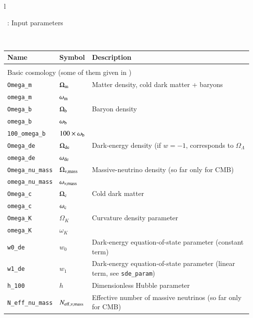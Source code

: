\documentclass[11pt, chapterprefix, headsepline]{scrartcl}
\begin{document}
\begin{longtable}{l}
% 

  \label{tab:spar}

 \centerline{\tablename\ \thetable{}: Input parameters}\\

 \endfirsthead

\begin{minipage}{\textwidth}
  \begin{tabularx}{\textwidth}{llX} \hline\hline
    \rul Name & Symbol & Description \\
    \hline \\
    \hline \multicolumn{3}{l}{\rul Basic cosmology \quad (some of them given in \file{cosmo.par})} \\ \hline
  \texttt{Omega\_m}  & $\Omega_{\rm m}$ & Matter density, cold dark matter +  baryons \\
  \texttt{omega\_m}  & $\omega_{\rm m}$ & \\
  \texttt{Omega\_b}  & $\Omega_{\rm b}$ & Baryon density \\
  \texttt{omega\_b}  & $\omega_{\rm b}$ & \\
  \texttt{100\_omega\_b}  & $100 \times \omega_{\rm b}$ & \\
  \texttt{Omega\_de} & $\Omega_{\rm de}$ & Dark-energy density (if $w=-1$, corresponds to $\Omega_\Lambda$ \\
  \texttt{omega\_de} & $\omega_{\rm de}$ & \\
  \texttt{Omega\_nu\_mass} & $\Omega_{\nu, {\rm mass}}$ & Massive-neutrino density (so far only for CMB) \\
  \texttt{omega\_nu\_mass} & $\omega_{\nu, {\rm mass}}$ & \\
  \texttt{Omega\_c}  & $\Omega_{\rm c}$ & Cold dark matter \\
  \texttt{omega\_c}  & $\omega_{\rm c}$ & \\
  \texttt{Omega\_K}  & $\Omega_K$ & Curvature density parameter \\
  \texttt{omega\_K}  & $\omega_K$ & \\
  \texttt{w0\_de}    & $w_0$ & Dark-energy equation-of-state parameter (constant term) \\
  \texttt{w1\_de}    & $w_1$ & Dark-energy equation-of-state parameter (linear term, see \texttt{sde\_param}) \\
  \texttt{h\_100}    & $h$ & Dimensionless Hubble parameter \\
  \texttt{N\_eff\_nu\_mass} & $N_{{\rm eff}, \nu, {\rm mass}}$ & Effective number of massive neutrinos (so far only for CMB) \\

\end{tabularx}
\end{minipage}
\end{longtable}
\end{document}
